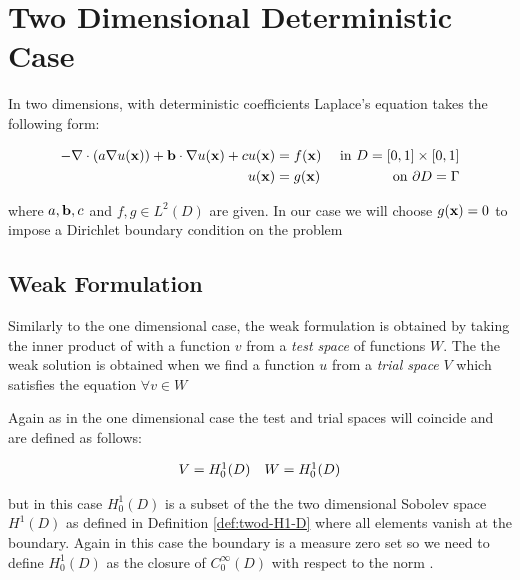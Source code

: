 \chapter{Two Dimensional Deterministic Case}\label{chap:twod-deterministic}

In two dimensions, with deterministic coefficients Laplace's equation takes the
following form:

\begin{equation}\label{eq:two-d-deterministic}
\begin{aligned}
    -\nabla\cdot(a\nabla u(\mathbf{x})) + \mathbf{b} \cdot \nabla u(\mathbf{x}) + c u(\mathbf{x}) &= f(\mathbf{x})
                               &\text{ in } D = [0,1] \times [0,1] \\
    u(\mathbf{x}) &= g(\mathbf{x}) &\text{ on } \partial D = \Gamma
\end{aligned}
\end{equation}

where $a,\mathbf{b} , c$ and $f, g \in L^2(D)$ are given. In our case we will choose
$g(\mathbf{x}) = 0$ to impose a Dirichlet boundary condition on the problem

\section{Weak Formulation}

Similarly to the one dimensional case, the weak formulation is obtained by
taking the inner product of  with a function $v$
from a \textit{test space} of functions $W$. The the weak solution is obtained
when we find a function $u$ from a \textit{trial space} $V$ which satisfies the
equation $\forall v \in W$

Again as in the one dimensional case the test and trial spaces will coincide
and are defined as follows:

\begin{equation}
    \begin{array}{c c}
        V = H^1_0(D) & W = H^1_0(D)
    \end{array}
\end{equation}

but in this case $H^1_0(D)$ is a subset of the the two dimensional Sobolev
space $H^1(D)$ as defined in Definition \ref{def:twod-H1-D} where all elements
vanish at the boundary. Again in this case the boundary is a measure zero set
so we need to define $H^1_0(D)$ as the closure of $C_0^\infty(D)$ with respect
to the norm .

